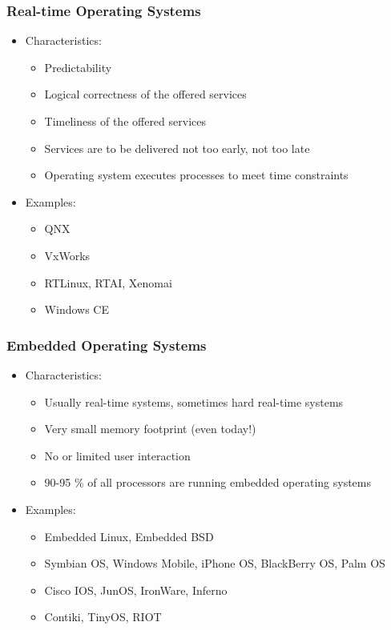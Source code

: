 \documentclass[11pt]{article}
\begin{document}
\subsubsection{Real-time Operating Systems}
\label{sec:org0e4d392}
\begin{itemize}
\item Characteristics:
\begin{itemize}
\item Predictability
\item Logical correctness of the offered services
\item Timeliness of the offered services
\item Services are to be delivered not too early, not too late
\item Operating system executes processes to meet time constraints
\end{itemize}
\item Examples:
\begin{itemize}
\item QNX
\item VxWorks
\item RTLinux, RTAI, Xenomai
\item Windows CE
\end{itemize}
\end{itemize}
\subsubsection{Embedded Operating Systems}
\label{sec:org19a0ac2}
\begin{itemize}
\item Characteristics:
\begin{itemize}
\item Usually real-time systems, sometimes hard real-time systems
\item Very small memory footprint (even today!)
\item No or limited user interaction
\item 90-95 \% of all processors are running embedded operating systems
\end{itemize}
\item Examples:
\begin{itemize}
\item Embedded Linux, Embedded BSD
\item Symbian OS, Windows Mobile, iPhone OS, BlackBerry OS, Palm OS
\item Cisco IOS, JunOS, IronWare, Inferno
\item Contiki, TinyOS, RIOT
\end{itemize}
\end{itemize}
\end{document}

